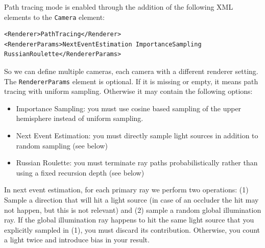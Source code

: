 \documentclass[12pt]{article}
\begin{document}
Path tracing mode is enabled through the addition of the following XML
elements to the \texttt{Camera} element:
%
\begin{verbatim}
<Renderer>PathTracing</Renderer>
<RendererParams>NextEventEstimation ImportanceSampling RussianRoulette</RendererParams>
\end{verbatim}
%
So we can define multiple cameras, each camera with a different renderer
setting. The \texttt{RendererParams} element is optional. If it is
missing or empty, it means path tracing with uniform sampling. Otherwise
it may contain the following options:
%
\begin{itemize}
\item Importance Sampling: you must use cosine based
sampling of the upper hemisphere instead of uniform sampling.
\item Next Event Estimation: you must directly sample light sources in
addition to random sampling (see below)
\item Russian Roulette: you must terminate ray paths probabilistically
rather than using a fixed recursion depth (see below)
\end{itemize}
%
In next event estimation, for each primary ray we perform two operations:
(1) Sample a direction that will hit a light source (in case of an
occluder the hit may not happen, but this is not relevant) and (2)
sample a random global illumination ray. If the global illumination ray
happens to hit the same light source that you explicitly sampled in (1),
you must discard its contribution. Otherwise, you count a light twice
and introduce bias in your result.
\end{document}

